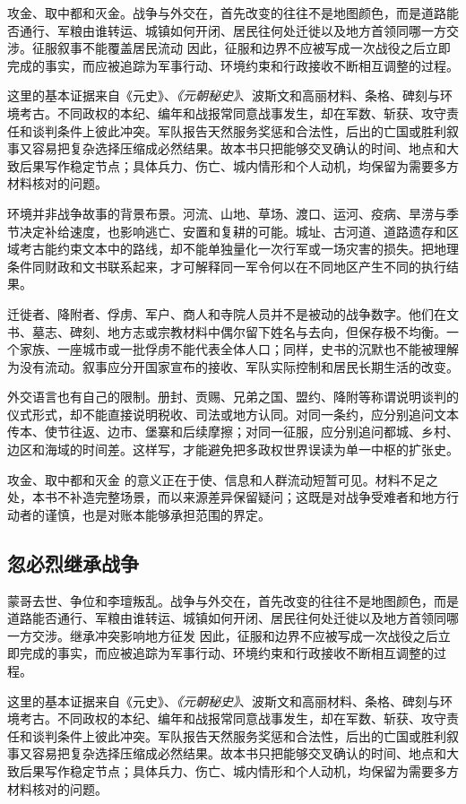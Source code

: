 攻金、取中都和灭金。战争与外交在，首先改变的往往不是地图颜色，而是道路能否通行、军粮由谁转运、城镇如何开闭、居民往何处迁徙以及地方首领同哪一方交涉。征服叙事不能覆盖居民流动 因此，征服和边界不应被写成一次战役之后立即完成的事实，而应被追踪为军事行动、环境约束和行政接收不断相互调整的过程。

这里的基本证据来自《元史》、\textit{《元朝秘史》}、波斯文和高丽材料、条格、碑刻与环境考古。不同政权的本纪、编年和战报常同意战事发生，却在军数、斩获、攻守责任和谈判条件上彼此冲突。军队报告天然服务奖惩和合法性，后出的亡国或胜利叙事又容易把复杂选择压缩成必然结果。故本书只把能够交叉确认的时间、地点和大致后果写作稳定节点；具体兵力、伤亡、城内情形和个人动机，均保留为需要多方材料核对的问题。

环境并非战争故事的背景布景。河流、山地、草场、渡口、运河、疫病、旱涝与季节决定补给速度，也影响逃亡、安置和复耕的可能。城址、古河道、道路遗存和区域考古能约束文本中的路线，却不能单独量化一次行军或一场灾害的损失。把地理条件同财政和文书联系起来，才可解释同一军令何以在不同地区产生不同的执行结果。

迁徙者、降附者、俘虏、军户、商人和寺院人员并不是被动的战争数字。他们在文书、墓志、碑刻、地方志或宗教材料中偶尔留下姓名与去向，但保存极不均衡。一个家族、一座城市或一批俘虏不能代表全体人口；同样，史书的沉默也不能被理解为没有流动。叙事应分开国家宣布的接收、军队实际控制和居民长期生活的改变。

外交语言也有自己的限制。册封、贡赐、兄弟之国、盟约、降附等称谓说明谈判的仪式形式，却不能直接说明税收、司法或地方认同。对同一条约，应分别追问文本传本、使节往返、边市、堡寨和后续摩擦；对同一征服，应分别追问都城、乡村、边区和海域的时间差。这样写，才能避免把多政权世界误读为单一中枢的扩张史。

攻金、取中都和灭金 的意义正在于使、信息和人群流动短暂可见。材料不足之处，本书不补造完整场景，而以来源差异保留疑问；这既是对战争受难者和地方行动者的谨慎，也是对账本能够承担范围的界定。

\subsection{忽必烈继承战争}

蒙哥去世、争位和李璮叛乱。战争与外交在，首先改变的往往不是地图颜色，而是道路能否通行、军粮由谁转运、城镇如何开闭、居民往何处迁徙以及地方首领同哪一方交涉。继承冲突影响地方征发 因此，征服和边界不应被写成一次战役之后立即完成的事实，而应被追踪为军事行动、环境约束和行政接收不断相互调整的过程。

这里的基本证据来自《元史》、\textit{《元朝秘史》}、波斯文和高丽材料、条格、碑刻与环境考古。不同政权的本纪、编年和战报常同意战事发生，却在军数、斩获、攻守责任和谈判条件上彼此冲突。军队报告天然服务奖惩和合法性，后出的亡国或胜利叙事又容易把复杂选择压缩成必然结果。故本书只把能够交叉确认的时间、地点和大致后果写作稳定节点；具体兵力、伤亡、城内情形和个人动机，均保留为需要多方材料核对的问题。

